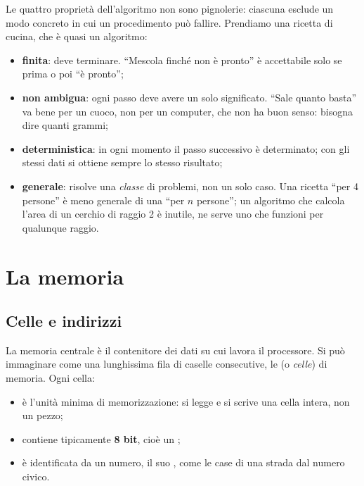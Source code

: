 Le quattro proprietà dell'algoritmo non sono pignolerie: ciascuna esclude un
modo concreto in cui un procedimento può fallire. Prendiamo una ricetta di
cucina, che è quasi un algoritmo:

\begin{itemize}
  \item \textbf{finita}: deve terminare. “Mescola finché non è pronto” è
        accettabile solo se prima o poi “è pronto”;
  \item \textbf{non ambigua}: ogni passo deve avere un solo significato.
        “Sale quanto basta” va bene per un cuoco, non per un computer, che
        non ha buon senso: bisogna dire quanti grammi;
  \item \textbf{deterministica}: in ogni momento il passo successivo è
        determinato; con gli stessi dati si ottiene sempre lo stesso
        risultato;
  \item \textbf{generale}: risolve una \textit{classe} di problemi, non un
        solo caso. Una ricetta “per 4 persone” è meno generale di una “per
        $n$ persone”; un algoritmo che calcola l'area di un cerchio di
        raggio 2 è inutile, ne serve uno che funzioni per qualunque raggio.
\end{itemize}

\section{La memoria}

\subsection{Celle e indirizzi}

La memoria centrale è il contenitore dei dati su cui lavora il processore.
Si può immaginare come una lunghissima fila di caselle consecutive, le
 (o \textit{celle}) di memoria. Ogni cella:

\begin{itemize}
  \item è l'unità minima di memorizzazione: si legge e si scrive una cella
        intera, non un pezzo;
  \item contiene tipicamente \textbf{8 bit}, cioè un ;
  \item è identificata da un numero, il suo , come le case
        di una strada dal numero civico.
\end{itemize}

